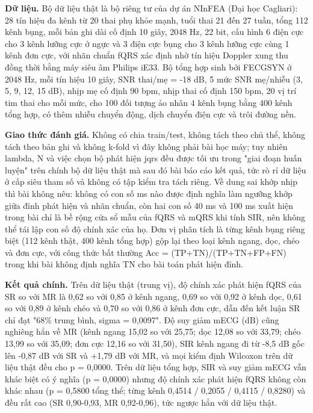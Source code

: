 \documentclass[12pt,a4paper]{article}
\begin{document}
\noindent \textbf{Dữ liệu.} Bộ dữ liệu thật là bộ riêng tư của dự án NInFEA (Đại học Cagliari): 28 tín hiệu đa kênh từ 20 thai phụ khỏe mạnh, tuổi thai 21 đến 27 tuần, tổng 112 kênh bụng, mỗi bản ghi dài cố định 10 giây, 2048 Hz, 22 bit, cấu hình 6 điện cực cho 3 kênh lưỡng cực ở ngực và 3 điện cực bụng cho 3 kênh lưỡng cực cùng 1 kênh đơn cực, với nhãn chuẩn fQRS xác định nhờ tín hiệu Doppler xung thu đồng thời bằng máy siêu âm Philips iE33. Bộ tổng hợp sinh bởi FECGSYN ở 2048 Hz, mỗi tín hiệu 10 giây, SNR thai/mẹ = -18 dB, 5 mức SNR mẹ/nhiễu (3, 5, 9, 12, 15 dB), nhịp mẹ cố định 90 bpm, nhịp thai cố định 150 bpm, 20 vị trí tim thai cho mỗi mức, cho 100 đối tượng ảo nhân 4 kênh bụng bằng 400 kênh tổng hợp, có thêm nhiễu chuyển động, dịch chuyển điện cực và trôi đường nền.\par\vspace{3pt}
\noindent \textbf{Giao thức đánh giá.} Không có chia train/test, không tách theo chủ thể, không tách theo bản ghi và không k-fold vì đây không phải bài học máy; tuy nhiên lambda, N và việc chọn bộ phát hiện jqrs đều được tối ưu trong "giai đoạn huấn luyện" trên chính bộ dữ liệu thật mà sau đó bài báo cáo kết quả, tức rò rỉ dữ liệu ở cấp siêu tham số và không có tập kiểm tra tách riêng. Về dung sai khớp nhịp thì bài không nêu: không có con số ms nào được định nghĩa làm ngưỡng khớp giữa đỉnh phát hiện và nhãn chuẩn, còn hai con số 40 ms và 100 ms xuất hiện trong bài chỉ là bề rộng cửa sổ mẫu của fQRS và mQRS khi tính SIR, nên không thể tái lập con số độ chính xác của họ. Đơn vị phân tích là từng kênh bụng riêng biệt (112 kênh thật, 400 kênh tổng hợp) gộp lại theo loại kênh ngang, dọc, chéo và đơn cực, với công thức bất thường Acc = (TP+TN)/(TP+TN+FP+FN) trong khi bài không định nghĩa TN cho bài toán phát hiện đỉnh.\par\vspace{3pt}
\noindent \textbf{Kết quả chính.} Trên dữ liệu thật (trung vị), độ chính xác phát hiện fQRS của SR so với MR là 0,62 so với 0,85 ở kênh ngang, 0,69 so với 0,92 ở kênh dọc, 0,61 so với 0,89 ở kênh chéo và 0,70 so với 0,86 ở kênh đơn cực, dẫn đến kết luận SR chỉ đạt "68\% trung bình, sigma = 0,0097". Độ suy giảm mECG (dB) cũng nghiêng hẳn về MR (kênh ngang 15,02 so với 25,75; dọc 12,08 so với 33,79; chéo 13,99 so với 35,09; đơn cực 12,16 so với 31,50), SIR kênh ngang đi từ -8,5 dB gốc lên -0,87 dB với SR và +1,79 dB với MR, và mọi kiểm định Wilcoxon trên dữ liệu thật đều cho p = 0,0000. Trên dữ liệu tổng hợp, SIR và suy giảm mECG vẫn khác biệt có ý nghĩa (p = 0,0000) nhưng độ chính xác phát hiện fQRS không còn khác nhau (p = 0,5800 tổng thể; từng kênh 0,4514 / 0,2055 / 0,4115 / 0,8280) và đều rất cao (SR 0,90-0,93, MR 0,92-0,96), tức ngược hẳn với dữ liệu thật.\par\vspace{3pt}
\end{document}
